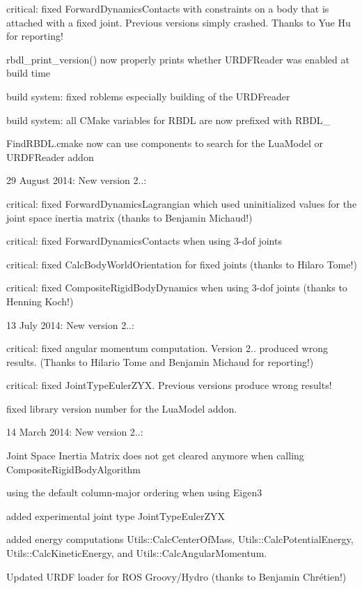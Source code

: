 \begin{DoxyItemize}
\begin{DoxyItemize}
\item critical\+: fixed Forward\+Dynamics\+Contacts with constraints on a body that is attached with a fixed joint. Previous versions simply crashed. Thanks to Yue Hu for reporting!
\item rbdl\+\_\+print\+\_\+version() now properly prints whether U\+R\+D\+F\+Reader was enabled at build time
\item build system\+: fixed roblems especially building of the U\+R\+D\+Freader
\item build system\+: all C\+Make variables for R\+B\+D\+L are now prefixed with R\+B\+D\+L\+\_\+
\item Find\+R\+B\+D\+L.\+cmake now can use components to search for the Lua\+Model or U\+R\+D\+F\+Reader addon
\end{DoxyItemize}
\item 29 August 2014\+: New version 2..\+:
\begin{DoxyItemize}
\item critical\+: fixed Forward\+Dynamics\+Lagrangian which used uninitialized values for the joint space inertia matrix (thanks to Benjamin Michaud!)
\item critical\+: fixed Forward\+Dynamics\+Contacts when using 3-\/dof joints
\item critical\+: fixed Calc\+Body\+World\+Orientation for fixed joints (thanks to Hilaro Tome!)
\item critical\+: fixed Composite\+Rigid\+Body\+Dynamics when using 3-\/dof joints (thanks to Henning Koch!)
\end{DoxyItemize}
\end{DoxyItemize}

13 July 2014\+: New version 2..\+:
\begin{DoxyItemize}
\item critical\+: fixed angular momentum computation. Version 2.. produced wrong results. (Thanks to Hilario Tome and Benjamin Michaud for reporting!)
\item critical\+: fixed Joint\+Type\+Euler\+Z\+Y\+X. Previous versions produce wrong results!
\item fixed library version number for the Lua\+Model addon.
\end{DoxyItemize}

14 March 2014\+: New version 2..\+:
\begin{DoxyItemize}
\item Joint Space Inertia Matrix does not get cleared anymore when calling Composite\+Rigid\+Body\+Algorithm
\item using the default column-\/major ordering when using Eigen3
\item added experimental joint type Joint\+Type\+Euler\+Z\+Y\+X
\item added energy computations Utils\+::\+Calc\+Center\+Of\+Mass, Utils\+::\+Calc\+Potential\+Energy, Utils\+::\+Calc\+Kinetic\+Energy, and Utils\+::\+Calc\+Angular\+Momentum.
\item Updated U\+R\+D\+F loader for R\+O\+S Groovy/\+Hydro (thanks to Benjamin Chrétien!)
\end{DoxyItemize}

